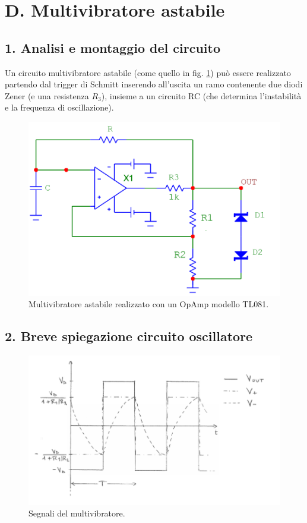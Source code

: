 \documentclass[10pt,a4paper]{article}
\begin{document}
\section*{D. Multivibratore astabile}
\subsection*{1. Analisi e montaggio del circuito}

Un circuito multivibratore astabile (come quello in fig. \ref{circuito4}) può essere realizzato partendo dal trigger di Schmitt inserendo all'uscita un ramo contenente due diodi Zener (e una resistenza $R_3$), insieme a un circuito RC (che determina l'instabilità e la frequenza di oscillazione).\\

\begin{figure}[h]
\centering
\includegraphics[scale=0.5]{multivibratoreAstabile.png}
\caption{Multivibratore astabile realizzato con un OpAmp modello TL081.\label{circuito4}}
\end{figure}

\subsection*{2. Breve spiegazione circuito oscillatore}

\begin{figure}[htb!]
\centering
\includegraphics[scale=.5]{funzionamentoOscillatore.png}
\caption{Segnali del multivibratore.}
\label{funzionamento}
\end{figure}
\end{document}
